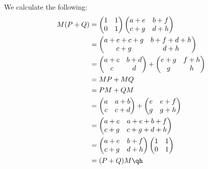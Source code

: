 \begin{sol}
    We calculate the following:
    \begin{align*}
        M(P + Q) & = 
        \begin{pmatrix}
            1 & 1 \\
            0 & 1
        \end{pmatrix}
        \begin{pmatrix}
            a + e & b + f \\
            c + g & d + h
        \end{pmatrix} \\
        & = 
        \begin{pmatrix}
            a + e + c + g & b + f + d + h \\
            c + g & d + h
        \end{pmatrix} \\
        & = 
        \begin{pmatrix}
            a + c & b + d \\
            c & d
        \end{pmatrix} + 
        \begin{pmatrix}
            e + g & f + h \\
            g & h
        \end{pmatrix} \\
        & = MP + MQ \\
        & = PM + QM \\
        & = 
        \begin{pmatrix}
            a & a + b \\
            c & c + d
        \end{pmatrix} + 
        \begin{pmatrix}
            e & e + f \\
            g & g + h
        \end{pmatrix} \\
        & = 
        \begin{pmatrix}
            a + e & a + e + b + f \\
            c + g & c + g + d + h
        \end{pmatrix} \\
        & = 
        \begin{pmatrix}
            a + e & b + f \\
            c + g & d + h
        \end{pmatrix}
        \begin{pmatrix}
            1 & 1 \\
            0 & 1
        \end{pmatrix} \\
        & = (P + Q)M \qh
    \end{align*}
\end{sol}

